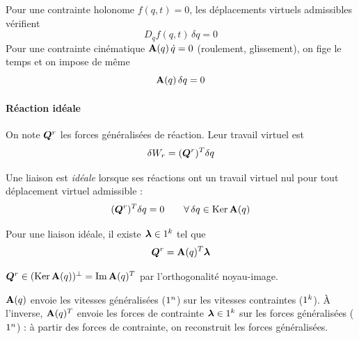 Pour une contrainte holonome $f(q,t) = 0$, les déplacements virtuels
admissibles vérifient
\[
    D_q f(q,t)\,\delta q = 0
\]
Pour une contrainte cinématique $\mathbf{A}(q)\,\dot q = 0$ (roulement,
glissement), on fige le temps et on impose de même
\[
    \mathbf{A}(q)\,\delta q = 0
\]

\paragraph{Réaction idéale}

On note $\bm{Q}^r$ les forces généralisées de réaction. Leur travail virtuel
est
\[
    \delta W_r = (\bm{Q}^r)^T\delta q
\]

\begin{definition}
    Une liaison est \emph{idéale} lorsque ses réactions ont un travail
    virtuel nul pour tout déplacement virtuel admissible :
    \[
        (\bm{Q}^r)^T\delta q = 0
        \qquad \forall\,\delta q\in\operatorname{Ker}\mathbf{A}(q)
    \]
\end{definition}

\begin{proposition}
    Pour une liaison idéale, il existe $\bm{\lambda}\in1^k$ tel que
    \[
        \bm{Q}^r = \mathbf{A}(q)^T\bm{\lambda}
    \]
\end{proposition}

\begin{demonstration}
    $\bm{Q}^r\in(\operatorname{Ker}\mathbf{A}(q))^\perp = \operatorname{Im}\mathbf{A}(q)^T$ par
    l'orthogonalité noyau-image.
\end{demonstration}

\begin{note}
    $\mathbf{A}(q)$ envoie les vitesses généralisées ($1^n$) sur les
    vitesses contraintes ($1^k$). À l'inverse, $\mathbf{A}(q)^T$ envoie
    les forces de contrainte $\bm{\lambda}\in1^k$ sur les forces
    généralisées ($1^n$) : à partir des forces de contrainte, on
    reconstruit les forces généralisées.
\end{note}

\newpage
